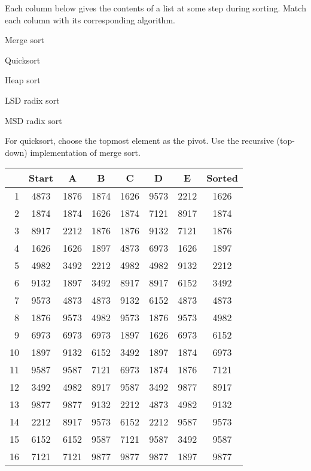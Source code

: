 \question Each column below gives the contents of a list at some step during
sorting. Match each column with its corresponding algorithm.

\begin{inparaitem}[$\cdot$]
\item Merge sort
\item Quicksort
\item Heap sort
\item LSD radix sort
\item MSD radix sort
\end{inparaitem}

For quicksort, choose the topmost element as the pivot. Use the recursive
(top-down) implementation of merge sort.

{
\renewcommand{\arraystretch}{1.5}
\setlength{\tabcolsep}{11pt}
\begin{ttfamily}
\begin{tabular}{r|ccccccc}
   & Start & A    & B    & C    & D    & E    & Sorted \\\hline
1  & 4873  & 1876 & 1874 & 1626 & 9573 & 2212 & 1626   \\
2  & 1874  & 1874 & 1626 & 1874 & 7121 & 8917 & 1874   \\
3  & 8917  & 2212 & 1876 & 1876 & 9132 & 7121 & 1876   \\
4  & 1626  & 1626 & 1897 & 4873 & 6973 & 1626 & 1897   \\
5  & 4982  & 3492 & 2212 & 4982 & 4982 & 9132 & 2212   \\
6  & 9132  & 1897 & 3492 & 8917 & 8917 & 6152 & 3492   \\
7  & 9573  & 4873 & 4873 & 9132 & 6152 & 4873 & 4873   \\
8  & 1876  & 9573 & 4982 & 9573 & 1876 & 9573 & 4982   \\
9  & 6973  & 6973 & 6973 & 1897 & 1626 & 6973 & 6152   \\
10 & 1897  & 9132 & 6152 & 3492 & 1897 & 1874 & 6973   \\
11 & 9587  & 9587 & 7121 & 6973 & 1874 & 1876 & 7121   \\
12 & 3492  & 4982 & 8917 & 9587 & 3492 & 9877 & 8917   \\
13 & 9877  & 9877 & 9132 & 2212 & 4873 & 4982 & 9132   \\
14 & 2212  & 8917 & 9573 & 6152 & 2212 & 9587 & 9573   \\
15 & 6152  & 6152 & 9587 & 7121 & 9587 & 3492 & 9587   \\
16 & 7121  & 7121 & 9877 & 9877 & 9877 & 1897 & 9877
\end{tabular}
\end{ttfamily}
}

